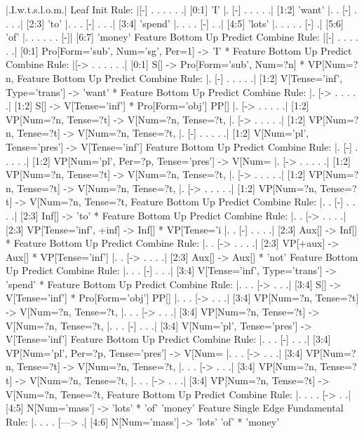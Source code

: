 \begin{code}
  |.I.w.t.s.l.o.m.|
  Leaf Init Rule:
  |[-] . . . . . .| [0:1] 'I'
  |. [-] . . . . .| [1:2] 'want'
  |. . [-] . . . .| [2:3] 'to'
  |. . . [-] . . .| [3:4] 'spend'
  |. . . . [-] . .| [4:5] 'lots'
  |. . . . . [-] .| [5:6] 'of'
  |. . . . . . [-]| [6:7] 'money'
  Feature Bottom Up Predict Combine Rule:
  |[-] . . . . . .| [0:1] Pro[Form='sub', Num='sg', Per=1] -> 'I' *
  Feature Bottom Up Predict Combine Rule:
  |[-> . . . . . .| [0:1] S[] -> Pro[Form='sub', Num=?n] * VP[Num=?n,
  Feature Bottom Up Predict Combine Rule:
  |. [-] . . . . .| [1:2] V[Tense='inf', Type='trans'] -> 'want' *
  Feature Bottom Up Predict Combine Rule:
  |. [-> . . . . .| [1:2] S[] -> V[Tense='inf'] * Pro[Form='obj'] PP[]
  |. [-> . . . . .| [1:2] VP[Num=?n, Tense=?t] -> V[Num=?n, Tense=?t,
  |. [-> . . . . .| [1:2] VP[Num=?n, Tense=?t] -> V[Num=?n, Tense=?t,
  |. [-] . . . . .| [1:2] V[Num='pl', Tense='pres'] -> V[Tense='inf']
  Feature Bottom Up Predict Combine Rule:
  |. [-] . . . . .| [1:2] VP[Num='pl', Per=?p, Tense='pres'] -> V[Num=
  |. [-> . . . . .| [1:2] VP[Num=?n, Tense=?t] -> V[Num=?n, Tense=?t,
  |. [-> . . . . .| [1:2] VP[Num=?n, Tense=?t] -> V[Num=?n, Tense=?t,
  |. [-> . . . . .| [1:2] VP[Num=?n, Tense=?t] -> V[Num=?n, Tense=?t,
  Feature Bottom Up Predict Combine Rule:
  |. . [-] . . . .| [2:3] Inf[] -> 'to' *
  Feature Bottom Up Predict Combine Rule:
  |. . [-> . . . .| [2:3] VP[Tense='inf', +inf] -> Inf[] * VP[Tense='i
  |. . [-] . . . .| [2:3] Aux[] -> Inf[] *
  Feature Bottom Up Predict Combine Rule:
  |. . [-> . . . .| [2:3] VP[+aux] -> Aux[] * VP[Tense='inf'] {}
  |. . [-> . . . .| [2:3] Aux[] -> Aux[] * 'not' {}
  Feature Bottom Up Predict Combine Rule:
  |. . . [-] . . .| [3:4] V[Tense='inf', Type='trans'] -> 'spend' *
  Feature Bottom Up Predict Combine Rule:
  |. . . [-> . . .| [3:4] S[] -> V[Tense='inf'] * Pro[Form='obj'] PP[]
  |. . . [-> . . .| [3:4] VP[Num=?n, Tense=?t] -> V[Num=?n, Tense=?t,
  |. . . [-> . . .| [3:4] VP[Num=?n, Tense=?t] -> V[Num=?n, Tense=?t,
  |. . . [-] . . .| [3:4] V[Num='pl', Tense='pres'] -> V[Tense='inf']
  Feature Bottom Up Predict Combine Rule:
  |. . . [-] . . .| [3:4] VP[Num='pl', Per=?p, Tense='pres'] -> V[Num=
  |. . . [-> . . .| [3:4] VP[Num=?n, Tense=?t] -> V[Num=?n, Tense=?t,
  |. . . [-> . . .| [3:4] VP[Num=?n, Tense=?t] -> V[Num=?n, Tense=?t,
  |. . . [-> . . .| [3:4] VP[Num=?n, Tense=?t] -> V[Num=?n, Tense=?t,
  Feature Bottom Up Predict Combine Rule:
  |. . . . [-> . .| [4:5] N[Num='mass'] -> 'lots' * 'of' 'money' {}
  Feature Single Edge Fundamental Rule:
  |. . . . [---> .| [4:6] N[Num='mass'] -> 'lots' 'of' * 'money' {}

\end{code}
